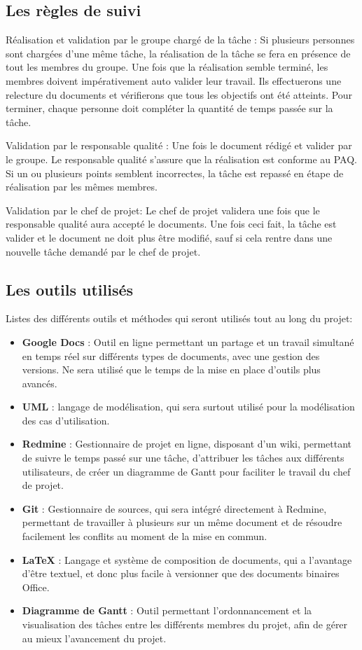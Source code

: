      \subsection{Les règles de suivi}
Réalisation et validation par le groupe chargé de la tâche :
Si plusieurs personnes sont chargées d’une même tâche, la réalisation de la tâche se fera en présence de tout les membres du groupe. Une fois que la réalisation semble terminé, les membres doivent impérativement auto valider leur travail. Ils effectuerons une relecture du documents et vérifierons que tous les objectifs ont été atteints. Pour terminer, chaque personne doit compléter la quantité de temps passée sur la tâche.

Validation par le responsable qualité :
Une fois le document rédigé et valider par le groupe. Le responsable qualité s’assure que la réalisation est conforme au PAQ. Si un ou plusieurs points semblent incorrectes, la tâche est repassé en étape de réalisation par les mêmes membres.

Validation par le chef de projet:
Le chef de projet validera une fois que le responsable qualité aura accepté le documents. Une fois ceci fait, la tâche est valider et le document ne doit plus être modifié, sauf si cela rentre dans une nouvelle tâche demandé par le chef de projet.

    \subsection{Les outils utilisés}
Listes des différents outils et méthodes qui seront utilisés tout au long du projet:
\begin{itemize}
\item \textbf{Google Docs} : Outil en ligne permettant un partage et un travail simultané en temps réel sur différents types de documents, avec une gestion des versions. Ne sera utilisé que le temps de la mise en place d’outils plus avancés.
\item \textbf{UML} : langage de modélisation, qui sera surtout utilisé pour la modélisation des cas d’utilisation.
\item \textbf{Redmine} : Gestionnaire de projet en ligne, disposant d’un wiki, permettant de suivre le temps passé sur une tâche, d’attribuer les tâches aux différents utilisateurs, de créer un  diagramme de Gantt pour faciliter le travail du chef de projet.
\item \textbf{Git} : Gestionnaire de sources, qui sera intégré directement à Redmine, permettant de travailler à plusieurs sur un même document et de résoudre facilement les conflits au moment de la mise en commun.
\item \textbf{LaTeX} : Langage et système de composition de documents, qui a l’avantage d’être textuel, et donc plus facile à versionner que des documents binaires Office.
\item \textbf{Diagramme de Gantt } : Outil permettant l’ordonnancement et la visualisation des tâches entre les différents membres du projet, afin de gérer au mieux l’avancement du projet.
\end{itemize}

